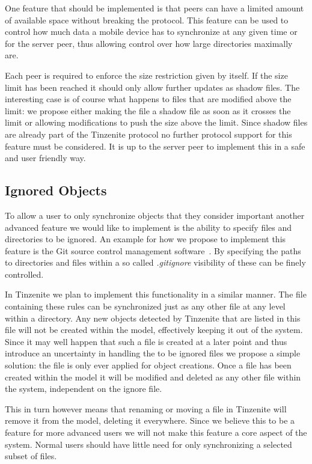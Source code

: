 One feature that should be implemented is that peers can have a limited amount of available space without breaking the protocol.
This feature can be used to control how much data a mobile device has to synchronize at any given time or for the server peer, thus allowing control over how large directories maximally are.

Each peer is required to enforce the size restriction given by itself.
If the size limit has been reached it should only allow further updates as shadow files.
The interesting case is of course what happens to files that are modified above the limit: we propose either making the file a shadow file as soon as it crosses the limit or allowing modifications to push the size above the limit.
Since shadow files are already part of the Tinzenite protocol no further protocol support for this feature must be considered.
It is up to the server peer to implement this in a safe and user friendly way.

\subsection{Ignored Objects}
\label{sub:Ignored Objects}

To allow a user to only synchronize objects that they consider important another advanced feature we would like to implement is the ability to specify files and directories to be ignored.
An example for how we propose to implement this feature is the Git source control management software~\cite{web:site:git}.
By specifying the paths to directories and files within a so called \textit{.gitignore} visibility of these can be finely controlled.

In Tinzenite we plan to implement this functionality in a similar manner.
The file containing these rules can be synchronized just as any other file at any level within a directory.
Any new objects detected by Tinzenite that are listed in this file will not be created within the model, effectively keeping it out of the system.
Since it may well happen that such a file is created at a later point and thus introduce an uncertainty in handling the to be ignored files we propose a simple solution: the file is only ever applied for object creations.
Once a file has been created within the model it will be modified and deleted as any other file within the system, independent on the ignore file.

This in turn however means that renaming or moving a file in Tinzenite will remove it from the model, deleting it everywhere.
Since we believe this to be a feature for more advanced users we will not make this feature a core aspect of the system.
Normal users should have little need for only synchronizing a selected subset of files.

